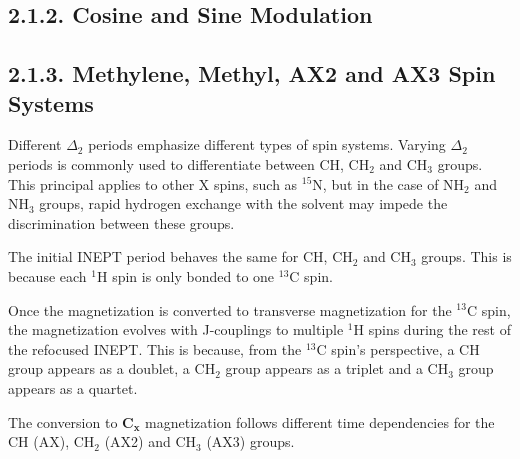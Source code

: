 \documentclass{tufte-book}
\begin{document}
\subsection{2.1.2. Cosine and Sine Modulation} \label{subsec:fundamental-solnnmr-inept-ref-inept-dm-cosine-and-sine-modulation}\setcounter{subsection}{2}
\subsection{2.1.3. Methylene, Methyl, AX2 and AX3 Spin Systems} \label{subsec:fundamental-solnnmr-inept-ref-inept-dm-methylene-methyl-ax2-and-ax3-spin-systems}
Different \ensuremath{\Delta_2} periods emphasize different types of spin
systems. Varying \ensuremath{\Delta_2} periods is commonly used to differentiate
between CH, CH\ensuremath{_{2}} and CH\ensuremath{_{3}} groups. This principal applies to
other X spins, such as \ensuremath{^{15}}N, but in the case of
NH\ensuremath{_{2}} and NH\ensuremath{_{3}} groups, rapid hydrogen
exchange with the solvent may impede the discrimination between these groups.

The initial INEPT period behaves the same for CH, CH\ensuremath{_{2}} and
CH\ensuremath{_{3}} groups. This is because each \ensuremath{^{1}}H spin is only bonded to
one \ensuremath{^{13}}C spin.

Once the magnetization is converted to transverse magnetization for
the \ensuremath{^{13}}C spin, the magnetization evolves with J-couplings to
multiple \ensuremath{^{1}}H spins during the rest of the refocused INEPT. This
is because, from the \ensuremath{^{13}}C spin’s perspective, a CH group
appears as a doublet, a CH\ensuremath{_{2}} group appears as a triplet and a CH\ensuremath{_{3}}
group appears as a quartet.

The conversion to \ensuremath{\boldsymbol{C_x}} magnetization follows different time
dependencies for the CH (AX), CH\ensuremath{_{2}} (AX2) and CH\ensuremath{_{3}} (AX3) groups.
\end{document}
